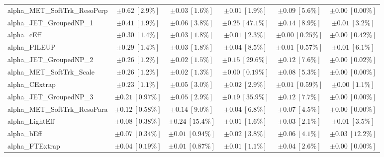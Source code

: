 \begin{sidewaystable}
\begin{center}
\begin{tabular*}{\textwidth}{@{\extracolsep{\fill}}lccccc}
alpha\_MET\_SoftTrk\_ResoPerp         & $\pm 0.62\ [2.9\%] $          & $\pm 0.03\ [1.6\%] $          & $\pm 0.01\ [1.9\%] $          & $\pm 0.09\ [5.6\%] $          & $\pm 0.00\ [0.00\%] $       \\
alpha\_JET\_GroupedNP\_1         & $\pm 0.41\ [1.9\%] $          & $\pm 0.06\ [3.8\%] $          & $\pm 0.25\ [47.1\%] $          & $\pm 0.14\ [8.9\%] $          & $\pm 0.01\ [3.2\%] $       \\
alpha\_cEff         & $\pm 0.30\ [1.4\%] $          & $\pm 0.03\ [1.8\%] $          & $\pm 0.01\ [2.3\%] $          & $\pm 0.00\ [0.25\%] $          & $\pm 0.00\ [0.42\%] $       \\
alpha\_PILEUP         & $\pm 0.29\ [1.4\%] $          & $\pm 0.03\ [1.8\%] $          & $\pm 0.04\ [8.5\%] $          & $\pm 0.01\ [0.57\%] $          & $\pm 0.01\ [6.1\%] $       \\
alpha\_JET\_GroupedNP\_2         & $\pm 0.26\ [1.2\%] $          & $\pm 0.02\ [1.5\%] $          & $\pm 0.15\ [29.6\%] $          & $\pm 0.12\ [7.6\%] $          & $\pm 0.00\ [0.02\%] $       \\
alpha\_MET\_SoftTrk\_Scale         & $\pm 0.26\ [1.2\%] $          & $\pm 0.02\ [1.3\%] $          & $\pm 0.00\ [0.19\%] $          & $\pm 0.08\ [5.3\%] $          & $\pm 0.00\ [0.00\%] $       \\
alpha\_CExtrap         & $\pm 0.23\ [1.1\%] $          & $\pm 0.05\ [3.0\%] $          & $\pm 0.02\ [2.9\%] $          & $\pm 0.01\ [0.59\%] $          & $\pm 0.00\ [1.1\%] $       \\
alpha\_JET\_GroupedNP\_3         & $\pm 0.21\ [0.97\%] $          & $\pm 0.05\ [2.9\%] $          & $\pm 0.19\ [35.9\%] $          & $\pm 0.12\ [7.7\%] $          & $\pm 0.00\ [0.00\%] $       \\
alpha\_MET\_SoftTrk\_ResoPara         & $\pm 0.12\ [0.58\%] $          & $\pm 0.14\ [9.0\%] $          & $\pm 0.04\ [6.8\%] $          & $\pm 0.07\ [4.5\%] $          & $\pm 0.00\ [0.00\%] $       \\
alpha\_LightEff         & $\pm 0.08\ [0.38\%] $          & $\pm 0.24\ [15.4\%] $          & $\pm 0.01\ [1.6\%] $          & $\pm 0.03\ [2.1\%] $          & $\pm 0.01\ [3.5\%] $       \\
alpha\_bEff         & $\pm 0.07\ [0.34\%] $          & $\pm 0.01\ [0.94\%] $          & $\pm 0.02\ [3.8\%] $          & $\pm 0.06\ [4.1\%] $          & $\pm 0.03\ [12.2\%] $       \\
alpha\_FTExtrap         & $\pm 0.04\ [0.19\%] $          & $\pm 0.01\ [0.87\%] $          & $\pm 0.01\ [1.1\%] $          & $\pm 0.04\ [2.6\%] $          & $\pm 0.00\ [0.00\%] $       \\

\end{tabular*}
\end{center}
\end{sidewaystable}
